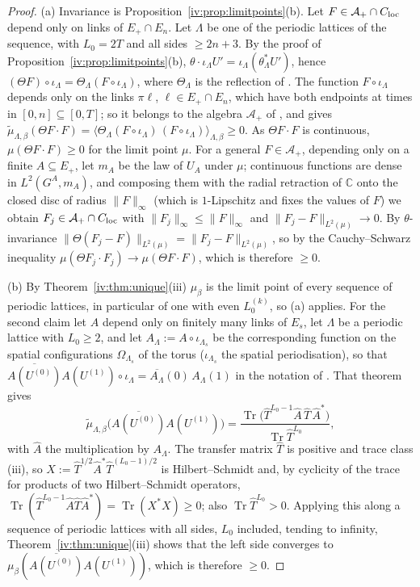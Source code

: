 \documentclass[11pt,a4paper]{article}
\theoremstyle{definition}
\theoremstyle{remark}
\DeclareMathOperator{\Tr}{Tr}
\newcommand{\C}{\mathbb{C}}
\newcommand{\cA}{\mathcal{A}}
\newcommand{\hT}{\hat{T}}
\newcommand{\norm}[1]{\lVert #1\rVert}
\newcommand{\Fref}[3]{\cite[#1~`#2' (\texttt{#3})]{F}}
\newcommand{\Flab}[2]{\cite[#1 \texttt{#2}]{F}}
\newcommand{\Fname}[2]{\cite[#1~`#2']{F}}
\begin{document}
\begin{proof}
(a) Invariance is Proposition~\ref{iv:prop:limitpoints}(b). Let $F\in\cA_+\cap C_{\rm loc}$ depend only on links of $E_+\cap E_n$. Let
$\Lambda$ be one of the periodic lattices of the sequence, with $L_0=2T$ and all sides $\ge2n+3$. By the proof of
Proposition~\ref{iv:prop:limitpoints}(b), $\theta\cdot\iota_\Lambda U'=\iota_\Lambda(\theta^*_\Lambda U')$, hence
$(\Theta F)\circ\iota_\Lambda=\Theta_\Lambda(F\circ\iota_\Lambda)$, where $\Theta_\Lambda$ is the reflection of
\Fname{Section}{Reflection positivity}. The function $F\circ\iota_\Lambda$ depends only on the links $\pi\ell$, $\ell\in E_+\cap E_n$,
which have both endpoints at times in $[0,n]\subseteq[0,T]$; so it belongs to the algebra $\cA_+$ of \cite{F}, and
\Flab{Theorem}{thm:rp} gives $\tilde\mu_{\Lambda,\beta}(\Theta F\cdot F)=\langle\Theta_\Lambda(F\circ\iota_\Lambda)\,(F\circ\iota_\Lambda)\rangle_{\Lambda,\beta}\ge0$.
As $\Theta F\cdot F$ is continuous, $\mu(\Theta F\cdot F)\ge0$ for the limit point $\mu$. For a general $F\in\cA_+$, depending only on a
finite $A\subseteq E_+$, let $m_A$ be the law of $U_A$ under $\mu$; continuous functions are dense in $L^2(G^A,m_A)$, and composing
them with the radial retraction of $\C$ onto the closed disc of radius $\norm F_\infty$ (which is $1$-Lipschitz and fixes the values
of $F$) we obtain $F_j\in\cA_+\cap C_{\rm loc}$ with $\norm{F_j}_\infty\le\norm F_\infty$ and $\norm{F_j-F}_{L^2(\mu)}\to0$. By
$\theta$-invariance $\norm{\Theta(F_j-F)}_{L^2(\mu)}=\norm{F_j-F}_{L^2(\mu)}$, so by the Cauchy--Schwarz inequality
$\mu(\Theta F_j\cdot F_j)\to\mu(\Theta F\cdot F)$, which is therefore $\ge0$.

(b) By Theorem~\ref{iv:thm:unique}(iii) $\mu_\beta$ is the limit point of every sequence of periodic lattices, in particular of one with
even $L_0^{(k)}$, so (a) applies. For the second claim let $A$ depend only on finitely many links of $E_s$, let $\Lambda$ be a
periodic lattice with $L_0\ge2$, and let $A_\Lambda:=A\circ\iota_{\Lambda_s}$ be the corresponding function on the spatial
configurations $\Omega_{\Lambda_s}$ of the torus ($\iota_{\Lambda_s}$ the spatial periodisation), so that $\overline{A(U^{(0)})}A(U^{(1)})\circ\iota_\Lambda=\overline{A_\Lambda}(0)\,A_\Lambda(1)$ in the notation of
\Fref{Theorem}{Transfer matrix formalism}{thm:tm}. That theorem gives
\[
\tilde\mu_{\Lambda,\beta}\bigl(\overline{A(U^{(0)})}A(U^{(1)})\bigr)=\frac{\Tr\bigl(\hT^{L_0-1}\hat A\,\hT\,\hat A^*\bigr)}{\Tr\hT^{L_0}},
\]
with $\hat A$ the multiplication by $A_\Lambda$. The transfer matrix $\hT$ is positive and trace class \Flab{Lemma}{lem:K}(iii), so
$X:=\hT^{1/2}\hat A^*\hT^{(L_0-1)/2}$ is Hilbert--Schmidt and, by cyclicity of the trace for products of two Hilbert--Schmidt
operators, $\Tr(\hT^{L_0-1}\hat A\hT\hat A^*)=\Tr(X^*X)\ge0$; also $\Tr\hT^{L_0}>0$. Applying this along a sequence of periodic lattices
with all sides, $L_0$ included, tending to infinity, Theorem~\ref{iv:thm:unique}(iii) shows that the left side converges to
$\mu_\beta(\overline{A(U^{(0)})}A(U^{(1)}))$, which is therefore $\ge0$.
\end{proof}
\end{document}
